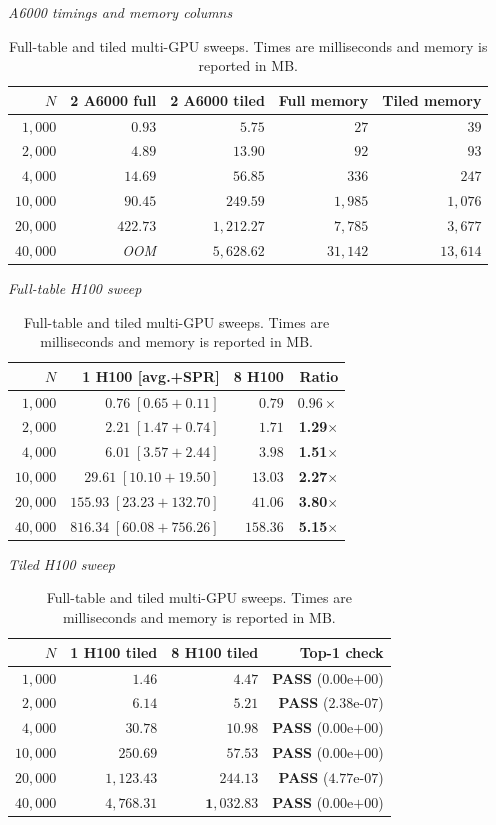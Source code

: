 \begin{table}[!htbp]
\centering\small
\setlength{\tabcolsep}{4pt}
\caption{Full-table and tiled multi-GPU sweeps. Times are milliseconds and memory is reported in MB.}
\label{tab:cuda_a6000_scaling}
\par\smallskip
\textit{A6000 timings and memory columns}\par\smallskip
\begin{tabular}{@{}rrrrr@{}}
\toprule
$N$ & 2 A6000 full & 2 A6000 tiled & Full memory & Tiled memory\\
\midrule
$1{,}000$ & $0.93$ & $5.75$ & $27$ & $39$\\
$2{,}000$ & $4.89$ & $13.90$ & $92$ & $93$\\
$4{,}000$ & $14.69$ & $56.85$ & $336$ & $247$\\
$10{,}000$ & $90.45$ & $249.59$ & $1{,}985$ & $1{,}076$\\
$20{,}000$ & $422.73$ & $1{,}212.27$ & $7{,}785$ & $3{,}677$\\
$40{,}000$ & \emph{OOM} & $5{,}628.62$ & $31{,}142$ & $13{,}614$\\
\bottomrule
\end{tabular}
\par\smallskip
\textit{Full-table H100 sweep}\par\smallskip
\begin{tabular}{@{}rrrr@{}}
\toprule
$N$ & 1 H100 [avg.+SPR] & 8 H100 & Ratio\\
\midrule
$1{,}000$ & $0.76\; [0.65 + 0.11]$ & $0.79$ & $0.96\times$\\
$2{,}000$ & $2.21\; [1.47 + 0.74]$ & $1.71$ & \textbf{1.29$\times$}\\
$4{,}000$ & $6.01\; [3.57 + 2.44]$ & $3.98$ & \textbf{1.51$\times$}\\
$10{,}000$ & $29.61\; [10.10 + 19.50]$ & $13.03$ & \textbf{2.27$\times$}\\
$20{,}000$ & $155.93\; [23.23 + 132.70]$ & $41.06$ & \textbf{3.80$\times$}\\
$40{,}000$ & $816.34\; [60.08 + 756.26]$ & $\mathbf{158.36}$ & \textbf{5.15$\times$}\\
\bottomrule
\end{tabular}
\par\smallskip
\textit{Tiled H100 sweep}\par\smallskip
\begin{tabular}{@{}rrrr@{}}
\toprule
$N$ & 1 H100 tiled & 8 H100 tiled & Top-1 check\\
\midrule
$1{,}000$ & $1.46$ & $4.47$ & \textbf{PASS} ($0.00\text{e+}00$)\\
$2{,}000$ & $6.14$ & $5.21$ & \textbf{PASS} ($2.38\text{e-}07$)\\
$4{,}000$ & $30.78$ & $10.98$ & \textbf{PASS} ($0.00\text{e+}00$)\\
$10{,}000$ & $250.69$ & $57.53$ & \textbf{PASS} ($0.00\text{e+}00$)\\
$20{,}000$ & $1{,}123.43$ & $244.13$ & \textbf{PASS} ($4.77\text{e-}07$)\\
$40{,}000$ & $4{,}768.31$ & $\mathbf{1{,}032.83}$ & \textbf{PASS} ($0.00\text{e+}00$)\\
\bottomrule
\end{tabular}


\end{table}

